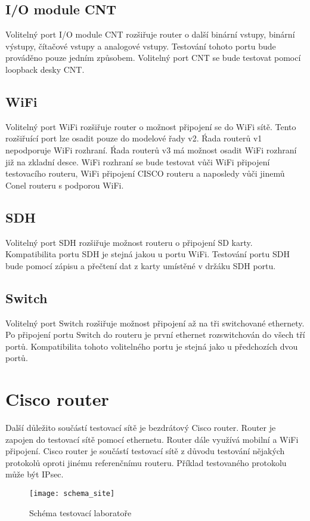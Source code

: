 \subsection{I/O module CNT}
Volitelný port I/O module CNT rozšiřuje router o další binární vstupy, binární výstupy, čítačové vstupy a analogové vstupy. Testování tohoto portu bude prováděno pouze jedním způsobem. Volitelný port CNT se bude testovat pomocí loopback desky CNT.

\subsection{WiFi}
Volitelný port WiFi rozšiřuje router o možnost připojení se do WiFi sítě. Tento rozšiřuící port lze osadit pouze do modelové řady v2. Ŕada routerů v1 nepodporuje WiFi rozhraní. Ŕada routerů v3 má možnost osadit WiFi rozhraní již na zkladní desce. WiFi rozhraní se bude testovat vůči WiFi připojení testovacího routeru, WiFi připojení CISCO routeru a naposledy vůči jinemů Conel routeru s podporou WiFi.

\subsection{SDH}
Volitelný port SDH rozšiřuje možnost routeru o připojení SD karty. Kompatibilita portu SDH je stejná jakou u portu WiFi. Testování portu SDH bude pomocí zápisu a přečtení dat z karty umístěné v držáku SDH portu.

\subsection{Switch}
Volitelný port Switch rozšiřuje možnost připojení až na tři switchované ethernety. Po připojení portu Switch do routeru je první ethernet rozswitchován do všech tří portů. Kompatibilita tohoto volitelného portu je stejná jako u předchozích dvou portů.

\section{Cisco router}
Další důležito součástí testovací sítě je bezdrátový Cisco router. Router je zapojen do testovací sítě pomocí ethernetu. Router dále využívá mobilní a WiFi připojení. Cisco router je součástí testovací sítě z důvodu testování nějakých protokolů oproti jinému referenčnímu routeru. Příklad testovaného protokolu může být IPsec.

\begin{figure}[h]
  \centering
  \texttt{[image: schema\_site]}
  \caption{Schéma testovací laboratoře}
  \label{fig:schema_site}
\end{figure}

\endinput
